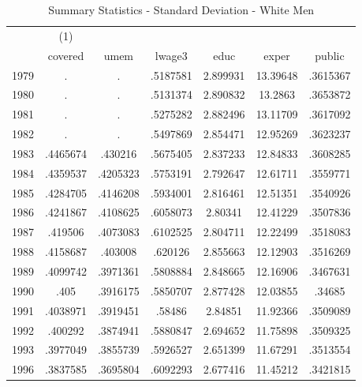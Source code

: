 {
\def\sym#1{\ifmmode^{#1}\else\(^{#1}\)\fi}
\begin{longtable}{l*{1}{cccccc}}
\caption{Summary Statistics - Standard Deviation - White Men}\\
\hline\hline\endfirsthead\hline\endhead\hline\endfoot\endlastfoot
            &\multicolumn{1}{c}{(1)}&            &            &            &            &            \\
            &     covered&        umem&      lwage3&        educ&       exper&      public\\
\hline
1979        &           .&           .&    .5187581&    2.899931&    13.39648&    .3615367\\
1980        &           .&           .&    .5131374&    2.890832&     13.2863&    .3653872\\
1981        &           .&           .&    .5275282&    2.882496&    13.11709&    .3617092\\
1982        &           .&           .&    .5497869&    2.854471&    12.95269&    .3623237\\
1983        &    .4465674&     .430216&    .5675405&    2.837233&    12.84833&    .3608285\\
1984        &    .4359537&    .4205323&    .5753191&    2.792647&    12.61711&    .3559771\\
1985        &    .4284705&    .4146208&    .5934001&    2.816461&    12.51351&    .3540926\\
1986        &    .4241867&    .4108625&    .6058073&     2.80341&    12.41229&    .3507836\\
1987        &     .419506&    .4073083&    .6102525&    2.804711&    12.22499&    .3518083\\
1988        &    .4158687&     .403008&     .620126&    2.855663&    12.12903&    .3516269\\
1989        &    .4099742&    .3971361&    .5808884&    2.848665&    12.16906&    .3467631\\
1990        &        .405&    .3916175&    .5850707&    2.877428&    12.03855&      .34685\\
1991        &    .4038971&    .3919451&      .58486&     2.84851&    11.92366&    .3509089\\
1992        &     .400292&    .3874941&    .5880847&    2.694652&    11.75898&    .3509325\\
1993        &    .3977049&    .3855739&    .5926527&    2.651399&    11.67291&    .3513554\\
1996        &    .3837585&    .3695804&    .6092293&    2.677416&    11.45212&    .3421815\\

\end{longtable}}
